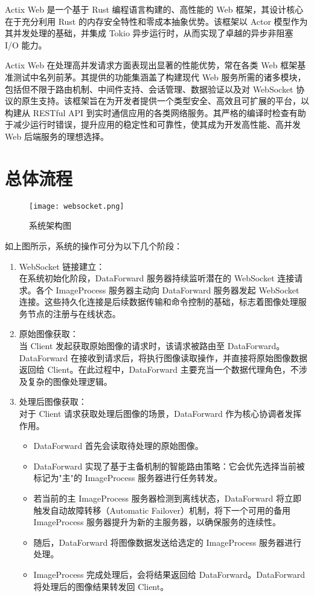 Actix Web 是一个基于 Rust 编程语言构建的、高性能的 Web 框架，其设计核心在于充分利用 Rust 的内存安全特性和零成本抽象优势。该框架以 Actor 模型作为其并发处理的基础，并集成 Tokio 异步运行时，从而实现了卓越的异步非阻塞 I/O 能力。

Actix Web 在处理高并发请求方面表现出显著的性能优势，常在各类 Web 框架基准测试中名列前茅。其提供的功能集涵盖了构建现代 Web 服务所需的诸多模块，包括但不限于路由机制、中间件支持、会话管理、数据验证以及对 WebSocket 协议的原生支持。该框架旨在为开发者提供一个类型安全、高效且可扩展的平台，以构建从 RESTful API 到实时通信应用的各类网络服务。其严格的编译时检查有助于减少运行时错误，提升应用的稳定性和可靠性，使其成为开发高性能、高并发 Web 后端服务的理想选择。

\section{总体流程}

\begin{figure}[H]  %
    \centering  %
    \texttt{[image: websocket.png]}  %
    \caption{系统架构图}  %
    \label{fig:websocket}
\end{figure}

如上图所示，系统的操作可分为以下几个阶段：

\begin{enumerate}
    \item WebSocket 链接建立：\\ 在系统初始化阶段，DataForward 服务器持续监听潜在的 WebSocket 连接请求。各个 ImageProcess 服务器主动向 DataForward 服务器发起 WebSocket 连接。这些持久化连接是后续数据传输和命令控制的基础，标志着图像处理服务节点的注册与在线状态。
    \item 原始图像获取：\\ 当 Client 发起获取原始图像的请求时，该请求被路由至 DataForward。DataForward 在接收到请求后，将执行图像读取操作，并直接将原始图像数据返回给 Client。在此过程中，DataForward 主要充当一个数据代理角色，不涉及复杂的图像处理逻辑。
    \item 处理后图像获取：\\ 对于 Client 请求获取处理后图像的场景，DataForward 作为核心协调者发挥作用。
    \begin{itemize}
        \item DataForward 首先会读取待处理的原始图像。
        \item DataForward 实现了基于主备机制的智能路由策略：它会优先选择当前被标记为"主"的 ImageProcess 服务器进行任务转发。
        \item 若当前的主 ImageProcess 服务器检测到离线状态，DataForward 将立即触发自动故障转移（Automatic Failover）机制，将下一个可用的备用 ImageProcess 服务器提升为新的主服务器，以确保服务的连续性。
        \item 随后，DataForward 将图像数据发送给选定的 ImageProcess 服务器进行处理。
        \item ImageProcess 完成处理后，会将结果返回给 DataForward。DataForward 将处理后的图像结果转发回 Client。
    \end{itemize}
\end{enumerate}

